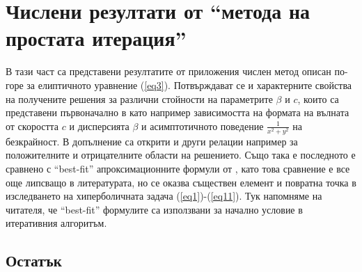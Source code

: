 \documentclass{article}
\newcommand{\rf}[1]{(\ref{#1})}
\begin{document}
\section{Числени резултати от ``метода на простата итерация''}\label{results}
В тази част са представени резултатите от приложения числен метод описан по-горе за елиптичното уравнение \rf{eq3}. Потвърждават се и характерните свойства на получените решения за различни стойности на параметрите $\beta$ и $c$, които са представени първоначално в \cite{ref116,Ch2011} като например зависимостта на формата на вълната от скоростта $c$ и дисперсията $\beta$ и асимптотичното поведение $\frac{1}{x^2 + y^2}$ на безкрайност. В допълнение са открити и други релации например за положителните и отрицателните области на решението.
Също така е последното е сравнено с ``best-fit'' апроксимационните формули от \cite{Ch2011}, като това сравнение е все още липсващо в литературата, но се оказва съществен елемент и повратна точка в изследването на хиперболичната задача \rf{eq1}-\rf{eq11}. Тук напомняме на читателя, че ``best-fit'' формулите са използвани за начално условие в итеративния алгоритъм.

\subsection{Остатък}
\end{document}
